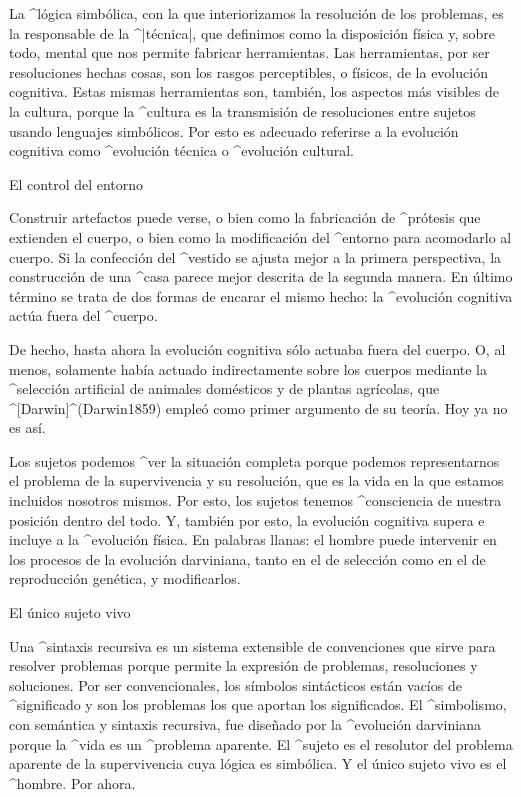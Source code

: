 La ^{lógica simbólica}, con la que interiorizamos la resolución de los
problemas, es la responsable de la ^|técnica|, que definimos como la
disposición física y, sobre todo, mental que nos permite fabricar
herramientas. Las herramientas, por ser resoluciones hechas cosas, son
los rasgos perceptibles, o físicos, de la evolución cognitiva. Estas
mismas herramientas son, también, los aspectos más visibles de la
cultura, porque la ^{cultura} es la transmisión de resoluciones entre
sujetos usando lenguajes simbólicos. Por esto es adecuado referirse a la
evolución cognitiva como ^{evolución técnica} o ^{evolución cultural}.


\Section El control del entorno

Construir artefactos puede verse, o bien como la fabricación de
^{prótesis} que extienden el cuerpo, o bien como la modificación del
^{entorno} para acomodarlo al cuerpo. Si la confección del ^{vestido} se
ajusta mejor a la primera perspectiva, la construcción de una ^{casa}
parece mejor descrita de la segunda manera. En último término se trata
de dos formas de encarar el mismo hecho: la ^{evolución cognitiva} actúa
fuera del ^{cuerpo}.

De hecho, hasta ahora la evolución cognitiva sólo actuaba fuera del
cuerpo. O, al menos, solamente había actuado indirectamente sobre los
cuerpos mediante la ^{selección artificial} de animales domésticos y de
plantas agrícolas, que ^[Darwin]^(Darwin1859) empleó como primer
argumento de su teoría. Hoy ya no es así.

Los sujetos podemos ^{ver} la situación completa porque podemos
representarnos el problema de la supervivencia y su resolución, que es
la vida en la que estamos incluidos nosotros mismos. Por esto, los
sujetos tenemos ^{consciencia} de nuestra posición dentro del todo. Y,
también por esto, la evolución cognitiva supera e incluye a la
^{evolución física}. En palabras llanas: el hombre puede intervenir en
los procesos de la evolución darviniana, tanto en el de selección como
en el de reproducción genética, y modificarlos.


\Section El único sujeto vivo

Una ^{sintaxis recursiva} es un sistema extensible de convenciones que
sirve para resolver problemas porque permite la expresión de problemas,
resoluciones y soluciones. Por ser convencionales, los símbolos
sintácticos están vacíos de ^{significado} y son los problemas los que
aportan los significados. El ^{simbolismo}, con semántica y sintaxis
recursiva, fue diseñado por la ^{evolución} darviniana porque la ^{vida}
es un ^{problema aparente}. El ^{sujeto} es el resolutor del problema
aparente de la supervivencia cuya lógica es simbólica. Y el único sujeto
vivo es el ^{hombre}. Por ahora.


